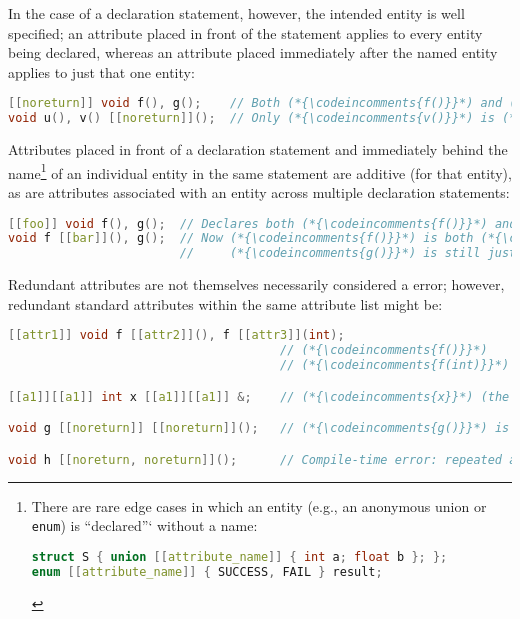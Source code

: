 \documentclass[twoside,10pt,letterpaper,usenames]{newstyle-PearsonGeneric-7-38}
\newcommand{\codeincomments}{\color{skyblue}\ttfamily}
\begin{document}
In the case of a declaration statement, however, the intended entity is
well specified; an attribute placed in front of the statement applies to
every entity being declared, whereas an attribute placed immediately
after the named entity applies to just that one entity:

\begin{lstlisting}[language=C++]
[[noreturn]] void f(), g();    // Both (*{\codeincomments{f()}}*) and (*{\codeincomments{g()}}*) are (*{\codeincomments{noreturn}}*).
void u(), v() [[noreturn]]();  // Only (*{\codeincomments{v()}}*) is (*{\codeincomments{noreturn}}*).
\end{lstlisting}
    

Attributes placed in front of a declaration statement and immediately
behind the name{\cprotect\footnote{There are rare edge cases in which an
entity (e.g., an anonymous union or \texttt{enum}) is ``declared''`
without a name:

\begin{lstlisting}[language=C++, basicstyle={\ttfamily\footnotesize}]
struct S { union [[attribute_name]] { int a; float b }; };
enum [[attribute_name]] { SUCCESS, FAIL } result;
\end{lstlisting}
    }} of an individual entity in the same statement are additive (for
that entity), as are attributes associated with an entity across
multiple declaration statements:

\begin{lstlisting}[language=C++]
[[foo]] void f(), g();  // Declares both (*{\codeincomments{f()}}*) and (*{\codeincomments{g()}}*) to be (*{\codeincomments{foo}}*).
void f [[bar]](), g();  // Now (*{\codeincomments{f()}}*) is both (*{\codeincomments{foo}}*) and (*{\codeincomments{bar}}*) while
                        //     (*{\codeincomments{g()}}*) is still just (*{\codeincomments{foo}}*).
\end{lstlisting}
    

Redundant attributes are not themselves necessarily considered a error;
however, redundant standard attributes within the same attribute list
might be:

\begin{lstlisting}[language=C++]
[[attr1]] void f [[attr2]](), f [[attr3]](int);
                                      // (*{\codeincomments{f()}}*)    is (*{\codeincomments{attr1}}*) and (*{\codeincomments{attr2}}*)
                                      // (*{\codeincomments{f(int)}}*) is (*{\codeincomments{attr1}}*) and (*{\codeincomments{attr3}}*)

[[a1]][[a1]] int x [[a1]][[a1]] &;    // (*{\codeincomments{x}}*) (the reference itself) is (*{\codeincomments{a1}}*)

void g [[noreturn]] [[noreturn]]();   // (*{\codeincomments{g()}}*) is (*{\codeincomments{noreturn}}*)

void h [[noreturn, noreturn]]();      // Compile-time error: repeated attribute
\end{lstlisting}
    
\end{document}
